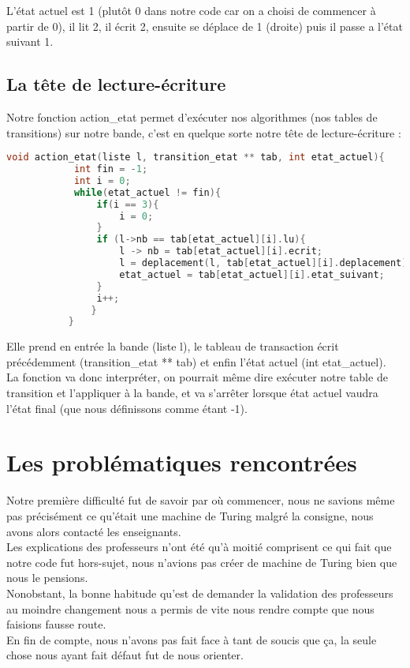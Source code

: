 \documentclass[a4paper,10pt]{article}
\begin{document}
        L’état actuel est 1 (plutôt 0 dans notre code car on a choisi de commencer à partir de 0), il lit 2, il écrit 2, ensuite se déplace de 1 (droite) puis il passe a l’état suivant 1. 
        \\[1 em]

    \subsection{La tête de lecture-écriture}
        Notre fonction action\_etat permet d'exécuter nos algorithmes (nos tables de transitions) sur notre bande, c'est en quelque sorte notre tête de lecture-écriture : 
        
        \begin{lstlisting}[language=c]
        void action_etat(liste l, transition_etat ** tab, int etat_actuel){
            int fin = -1;
            int i = 0;
            while(etat_actuel != fin){
                if(i == 3){
                    i = 0;
                }
                if (l->nb == tab[etat_actuel][i].lu){
                    l -> nb = tab[etat_actuel][i].ecrit;
                    l = deplacement(l, tab[etat_actuel][i].deplacement);             
                    etat_actuel = tab[etat_actuel][i].etat_suivant;
                }
                i++;
               }
           }
        \end{lstlisting}
        
        Elle prend en entrée la bande (liste l), le tableau de transaction écrit précédemment (transition\_etat ** tab) et enfin l'état actuel (int etat\_actuel).
        \\[1 em] 
        La fonction va donc interpréter, on pourrait même dire exécuter notre table de transition et l'appliquer à la bande, et va s'arrêter lorsque état actuel vaudra l'état final (que nous définissons comme étant -1).


\section{Les problématiques rencontrées}
    Notre première difficulté fut de savoir par où commencer, nous ne savions même pas précisément ce qu'était une machine de Turing malgré la consigne, nous avons alors contacté les enseignants.
    \\[1 em] 
    Les explications des professeurs n'ont été qu'à moitié comprisent ce qui fait que notre code fut hors-sujet, nous n'avions pas créer de machine de Turing bien que nous le pensions.
    \\[1 em] 
    Nonobstant, la bonne habitude qu'est de demander la validation des professeurs au moindre changement nous a permis de vite nous rendre compte que nous faisions fausse route.
    \\[1 em] 
    En fin de compte, nous n'avons pas fait face à tant de soucis que ça, la seule chose nous ayant fait défaut fut de nous orienter.
    
\end{document}

